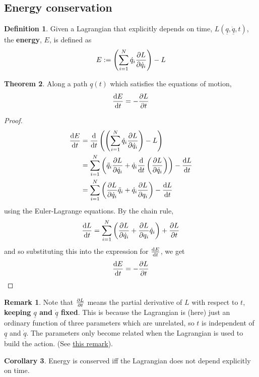 \documentclass[12pt,a4paper]{article}
\theoremstyle{definition}
\newtheorem{definition}{Definition}[subsection]
\newtheorem{theorem}[definition]{Theorem}
\newtheorem{corollary}[definition]{Corollary}
\newtheorem*{remark}{Remark}
\begin{document}
\subsection{Energy conservation}

\begin{definition}
	Given a Lagrangian that explicitly depends on time, $L(\underline{q}, \underline{\dot{q}}, t)$, the \textbf{energy}, $E$, is defined as
	\[
		E := \left( \sum_{i = 1}^{N} \dot{q}_i \diffp{L}{\dot{q}_i} \right) - L
	\]
\end{definition}

\begin{theorem}
	Along a path $\underline{q}(t)$ which satisfies the equations of motion,
	\[
		\diff{E}{t} = -\diffp{L}{t}
	\]
\end{theorem}

\begin{proof}
	\[
		\begin{aligned}
			\diff{E}{t}
				& = \diff{}{t} \left( \left( \sum_{i = 1}^{N} \dot{q}_i \diffp{L}{\dot{q}_i} \right) - L \right) \\
				& = \sum_{i = 1}^{N} \left( \ddot{q}_i \diffp{L}{\dot{q}_i} + \dot{q}_i \diff{}{t} \left( \diffp{L}{\dot{q}_i} \right) \right) - \diff{L}{t} \\
				& = \sum_{i = 1}^{N} \left( \diffp{L}{\dot{q}_i} \ddot{q}_i + \dot{q}_i \diffp{L}{q_i} \right) - \diff{L}{t}
		\end{aligned}
	\]
	using the Euler-Lagrange equations. By the chain rule,
	\[
		\diff{L}{t} = \sum_{i = 1}^{N} \left( \diffp{L}{\dot{q}_i} + \diffp{L}{q_i} \dot{q}_i \right) + \diffp{L}{t}
	\]
	and so substituting this into the expression for $\diff{E}{t}$, we get
	\[
		\diff{E}{t} = -\diffp{L}{t}
	\]
\end{proof}

\begin{remark}
	Note that $\diffp{L}{t}$ means the partial derivative of $L$ with respect to $t$, \textbf{keeping $\underline{q}$ and $\underline{\dot{q}}$ fixed}. This is because the Lagrangian is (here) just an ordinary function of three parameters which are unrelated, so $t$ is independent of $\underline{q}$ and $\underline{\dot{q}}$. The parameters only become related when the Lagrangian is used to build the action. (See \hyperref[rem:lagrangianParametersIndependent]{this remark}).
\end{remark}

\begin{corollary}
	Energy is conserved iff the Lagrangian does not depend explicitly on time.
\end{corollary}
\end{document}
